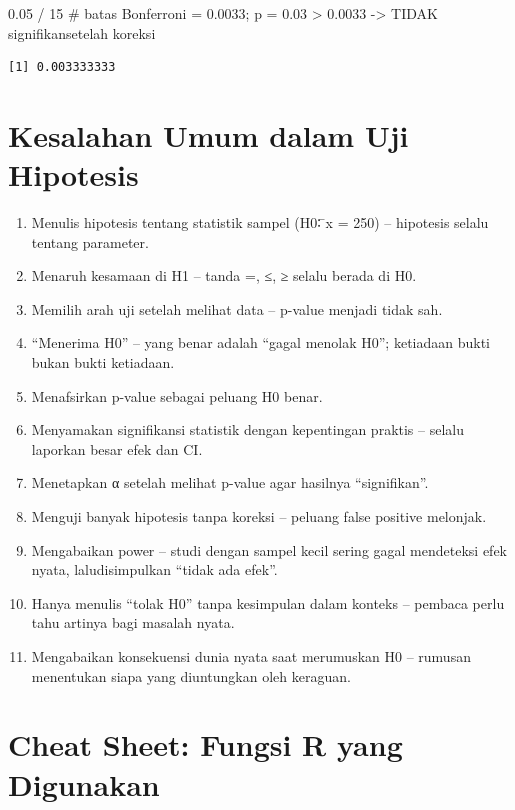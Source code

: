 \documentclass[
  indonesian,
  letterpaper,
]{book}
\newenvironment{Shaded}{\begin{snugshade}}{\end{snugshade}}
\newcommand{\CommentTok}[1]{\textcolor[rgb]{0.37,0.37,0.37}{#1}}
\newcommand{\DecValTok}[1]{\textcolor[rgb]{0.68,0.00,0.00}{#1}}
\newcommand{\FloatTok}[1]{\textcolor[rgb]{0.68,0.00,0.00}{#1}}
\newcommand{\SpecialCharTok}[1]{\textcolor[rgb]{0.37,0.37,0.37}{#1}}
\begin{document}
\begin{Shaded}
\begin{Highlighting}[]
\FloatTok{0.05} \SpecialCharTok{/} \DecValTok{15} \CommentTok{\# batas Bonferroni = 0.0033; p = 0.03 \textgreater{} 0.0033 {-}\textgreater{} TIDAK signifikansetelah koreksi}
\end{Highlighting}
\end{Shaded}

\begin{verbatim}
[1] 0.003333333
\end{verbatim}

\section{Kesalahan Umum dalam Uji
Hipotesis}\label{kesalahan-umum-dalam-uji-hipotesis}

\begin{enumerate}
\def\labelenumi{\arabic{enumi}.}
\item
  Menulis hipotesis tentang statistik sampel (H0∶ ̄x = 250) -- hipotesis
  selalu tentang parameter.
\item
  Menaruh kesamaan di H1 -- tanda =, ≤, ≥ selalu berada di H0.
\item
  Memilih arah uji setelah melihat data -- p-value menjadi tidak sah.
\item
  ``Menerima H0'' -- yang benar adalah ``gagal menolak H0''; ketiadaan
  bukti bukan bukti ketiadaan.
\item
  Menafsirkan p-value sebagai peluang H0 benar.
\item
  Menyamakan signifikansi statistik dengan kepentingan praktis -- selalu
  laporkan besar efek dan CI.
\item
  Menetapkan α setelah melihat p-value agar hasilnya ``signifikan''.
\item
  Menguji banyak hipotesis tanpa koreksi -- peluang false positive
  melonjak.
\item
  Mengabaikan power -- studi dengan sampel kecil sering gagal mendeteksi
  efek nyata, laludisimpulkan ``tidak ada efek''.
\item
  Hanya menulis ``tolak H0'' tanpa kesimpulan dalam konteks -- pembaca
  perlu tahu artinya bagi masalah nyata.
\item
  Mengabaikan konsekuensi dunia nyata saat merumuskan H0 -- rumusan
  menentukan siapa yang diuntungkan oleh keraguan.
\end{enumerate}

\section{Cheat Sheet: Fungsi R yang
Digunakan}\label{cheat-sheet-fungsi-r-yang-digunakan-1}
\end{document}
